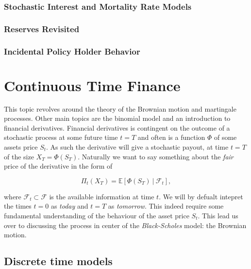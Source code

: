 \documentclass[
]{book}
\begin{document}
\hypertarget{stochastic-interest-and-mortality-rate-models}{%
\subsection{Stochastic Interest and Mortality Rate Models}\label{stochastic-interest-and-mortality-rate-models}}

\hypertarget{reserves-revisited-1}{%
\subsection{Reserves Revisited}\label{reserves-revisited-1}}

\hypertarget{incidental-policy-holder-behavior}{%
\subsection{Incidental Policy Holder Behavior}\label{incidental-policy-holder-behavior}}

\hypertarget{continuous-time-finance}{%
\chapter{Continuous Time Finance}\label{continuous-time-finance}}

This topic revolves around the theory of the Brownian motion and martingale processes. Other main topics are the binomial model and an introduction to financial derivatives. Financial derivatives is contingent on the outcome of a stochastic process at some future time \(t=T\) and often is a function \(\Phi\) of some assets price \(S_t\). As such the derivative will give a stochastic payout, at time \(t=T\) of the size \(X_T=\Phi(S_T)\). Naturally we want to say something about the \emph{fair} price of the derivative in the form of

\[\Pi_t(X_T)=\mathbb{E}\left[\Phi(S_T)\ \vert\ \mathcal{F}_t\right],\]

where \(\mathcal{F}_t\subset\mathcal{F}\) is the available information at time \(t\). We will by defualt intepret the times \(t=0\) as \emph{today} and \(t=T\) as \emph{tomorrow}. This indeed require some fundamental understanding of the behaviour of the asset price \(S_t\). This lead us over to discussing the process in center of the \emph{Black-Scholes} model: the Brownian motion.

\hypertarget{discrete-time-models}{%
\section{Discrete time models}\label{discrete-time-models}}
\end{document}

